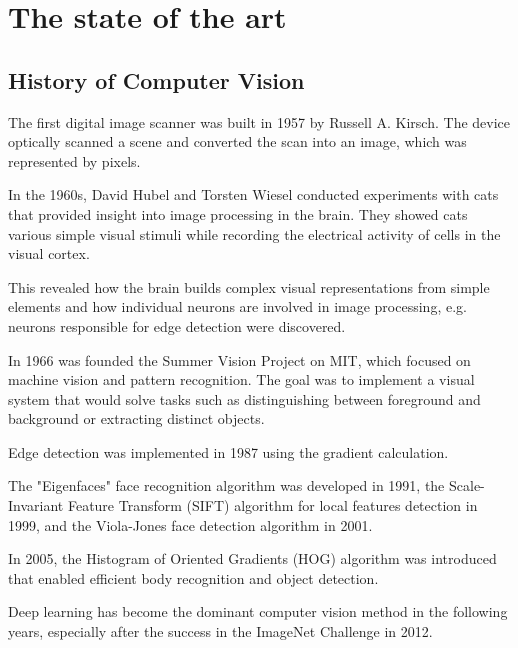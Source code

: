 \chapter{The state of the art}

\section{History of Computer Vision}
The first digital image scanner was built in 1957 by Russell A. Kirsch. The device optically scanned a scene and converted the scan into an image, which was represented by pixels.\par
In the 1960s, David Hubel and Torsten Wiesel conducted experiments with cats that provided insight into image processing in the brain. They showed cats various simple visual stimuli while recording the electrical activity of cells in the visual cortex.\par
This revealed how the brain builds complex visual representations from simple elements and how individual neurons are involved in image processing, e.g. neurons responsible for edge detection were discovered.\par
In 1966 was founded the Summer Vision Project on MIT, which focused on machine vision and pattern recognition. The goal was to implement a visual system that would solve tasks such as distinguishing between foreground and background or extracting distinct objects.\par
Edge detection was implemented in 1987 using the gradient calculation.\par
The "Eigenfaces" face recognition algorithm was developed in 1991, the Scale-Invariant Feature Transform (SIFT) algorithm for local features detection in 1999, and the Viola-Jones face detection algorithm in 2001.\par
In 2005, the Histogram of Oriented Gradients (HOG) algorithm was introduced that enabled efficient body recognition and object detection.\par
Deep learning has become the dominant computer vision method in the following years, especially after the success in the ImageNet Challenge in 2012.\par

